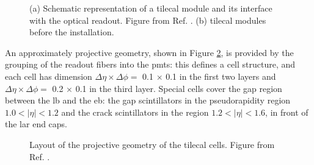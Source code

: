 \begin{figure}[ht]
\centering
{}
\caption{(a) Schematic representation of a \gls{tilecal} module and its interface with the optical readout. Figure from Ref. \cite{atlas:atlas}. (b) \gls{tilecal} modules before the installation.}
\label{fig:atlas:tile}
\end{figure}

An approximately projective geometry, shown in Figure \ref{fig:atlas:tile_cells}, is provided by the grouping of the readout fibers into the \glspl{pmt}: this defines a cell structure, and each cell has dimension $\Delta\eta \times \Delta\phi = $ 0.1 $\times$ 0.1 in the first two layers and $\Delta\eta \times \Delta\phi = $ 0.2 $\times$ 0.1 in the third layer. Special cells cover the gap region between the \gls{lb} and the \gls{eb}: the gap scintillators in the pseudorapidity region $1.0<|\eta|<1.2$ and the crack scintillators in the region $1.2<|\eta|<1.6$, in front of the \gls{lar} end caps.

\begin{figure}[ht]
\centering
{}
\caption{Layout of the projective geometry of the \gls{tilecal} cells. Figure from Ref. \cite{atlas:atlas}.}
\label{fig:atlas:tile_cells}
\end{figure}

